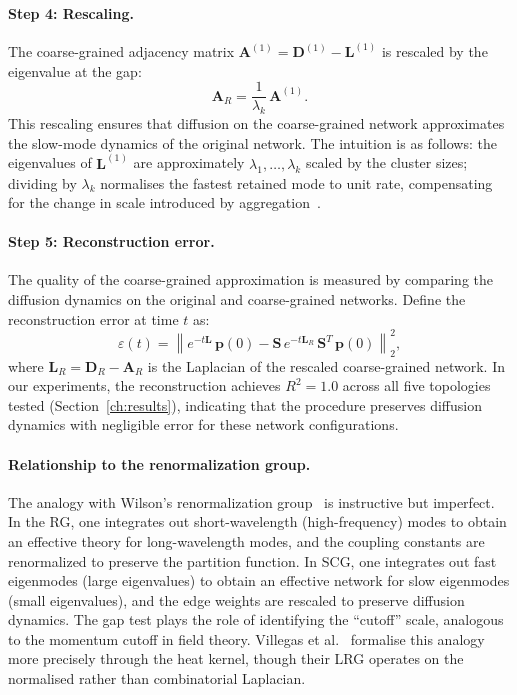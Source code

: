 \paragraph{Step 4: Rescaling.}
The coarse-grained adjacency matrix $\mathbf{A}^{(1)} = \mathbf{D}^{(1)}
- \mathbf{L}^{(1)}$ is rescaled by the eigenvalue at the gap:
\begin{equation}
\mathbf{A}_R = \frac{1}{\lambda_k}\,\mathbf{A}^{(1)}.
\label{eq:rescaling}
\end{equation}
This rescaling ensures that diffusion on the coarse-grained network
approximates the slow-mode dynamics of the original network.  The
intuition is as follows: the eigenvalues of $\mathbf{L}^{(1)}$ are
approximately $\lambda_1, \ldots, \lambda_k$ scaled by the cluster
sizes; dividing by $\lambda_k$ normalises the fastest retained mode
to unit rate, compensating for the change in scale introduced by
aggregation~\cite{schmidt2024spectral}.

\paragraph{Step 5: Reconstruction error.}
The quality of the coarse-grained approximation is measured by comparing
the diffusion dynamics on the original and coarse-grained networks.
Define the reconstruction error at time $t$ as:
\begin{equation}
\varepsilon(t) = \left\|e^{-t\mathbf{L}}\,\mathbf{p}(0) -
\mathbf{S}\,e^{-t\mathbf{L}_R}\,\mathbf{S}^T\,\mathbf{p}(0)
\right\|_2^2,
\label{eq:reconstruction_error}
\end{equation}
where $\mathbf{L}_R = \mathbf{D}_R - \mathbf{A}_R$ is the Laplacian of
the rescaled coarse-grained network.  In our experiments, the
reconstruction achieves $R^2 = 1.0$ across all five topologies tested
(Section~\ref{ch:results}), indicating that the procedure preserves
diffusion dynamics with negligible error for these network
configurations.

\paragraph{Relationship to the renormalization group.}
The analogy with Wilson's renormalization
group~\cite{wilson1975renormalization} is instructive but imperfect.  In
the RG, one integrates out short-wavelength (high-frequency) modes to
obtain an effective theory for long-wavelength modes, and the coupling
constants are renormalized to preserve the partition function.  In SCG,
one integrates out fast eigenmodes (large eigenvalues) to obtain an
effective network for slow eigenmodes (small eigenvalues), and the edge
weights are rescaled to preserve diffusion dynamics.  The gap test plays
the role of identifying the ``cutoff'' scale, analogous to the momentum
cutoff in field theory.  Villegas et al.~\cite{villegas2023laplacian}
formalise this analogy more precisely through the heat kernel, though
their LRG operates on the normalised rather than combinatorial
Laplacian.

